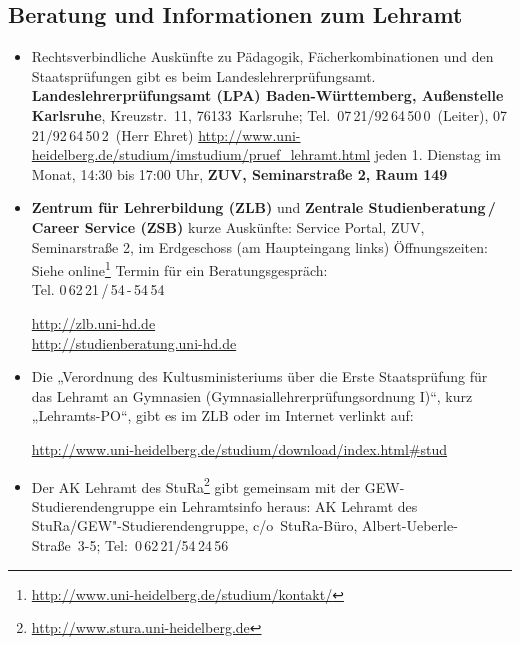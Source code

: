 \newpage\subsection{\Large Beratung und Informationen zum Lehramt}%
\begin{itemize}
\item Rechtsverbindliche Auskünfte zu Pädagogik, Fächerkombinationen und
      den Staatsprüfungen gibt es beim Landeslehrerprüfungsamt. \newline
      \textbf{Landeslehrerprüfungsamt (LPA) Baden-Württemberg,
           Außenstelle Karlsruhe},
      Kreuzstr.~11, 76133~Karlsruhe; \newline
Tel.~07\,21/92\,64\,50\,0~(Leiter), 07\,21/92\,64\,50\,2~(Herr Ehret) \newline
      \url{http://www.uni-heidelberg.de/studium/imstudium/pruef_lehramt.html} \newline
      jeden 1. Dienstag im Monat, 14:30 bis 17:00 Uhr,
      \textbf{\gls{ZUV}, Seminarstraße 2, Raum 149}


\item \textbf{Zentrum für Lehrerbildung (ZLB)} und \textbf{Zentrale Studienberatung\,/\,Career Service (ZSB)} \newline
      kurze Auskünfte: Service Portal, \gls{ZUV}, Seminarstraße 2, im Erdgeschoss (am Haupteingang links)
      Öffnungszeiten: Siehe online\footnote{\url{http://www.uni-heidelberg.de/studium/kontakt/}} \newline
      Termin für ein Beratungsgespräch: \\ Tel. 0\,62\,21\,/\,54\,-\,54\,54

      \url{http://zlb.uni-hd.de}\\
      \url{http://studienberatung.uni-hd.de}

\item Die „Verordnung des Kultusministeriums über die Erste Staatsprüfung für das Lehramt an Gymnasien (Gymnasiallehrerprüfungsordnung I)“, kurz „Lehramts-PO“, gibt es im ZLB oder im Internet verlinkt auf:

      \url{http://www.uni-heidelberg.de/studium/download/index.html#stud}


\item Der AK Lehramt des StuRa\footnote{\url{http://www.stura.uni-heidelberg.de}} gibt gemeinsam mit der  GEW-Stu\-dier\-en\-den\-grup\-pe ein Lehramtsinfo heraus: \newline AK Lehramt des StuRa/GEW"-Studierendengruppe, c/o~StuRa-Büro, Albert-Ueberle-Straße~3-5; Tel:~0\,62\,21/54\,24\,56


\end{itemize}

